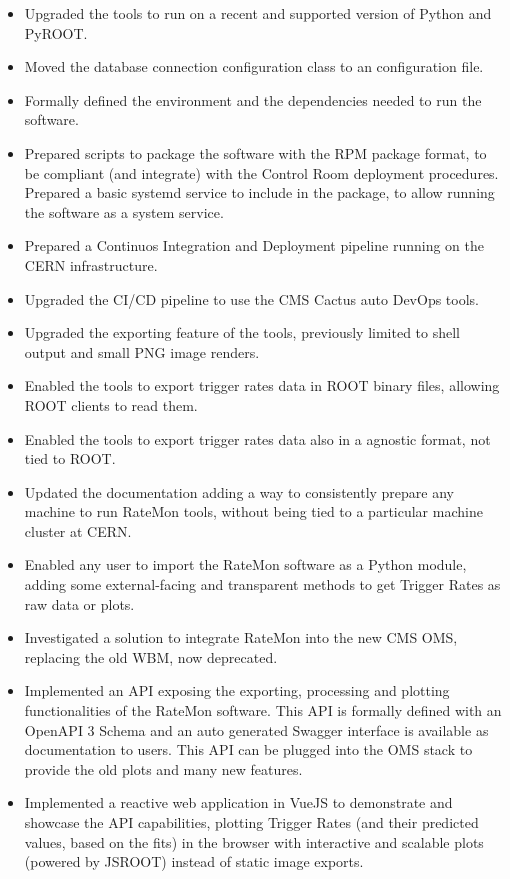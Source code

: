 \documentclass[a4, oneside, 11pt, nobib]{memoir}
\begin{document}
		\begin{itemize}

		\item Upgraded the tools to run on a recent and supported version of Python and PyROOT.
		\item Moved the database connection configuration class to an configuration file.
		\item Formally defined the environment and the dependencies needed to run the software.
		\item Prepared scripts to package the software with the RPM package format, to be compliant (and integrate) with the Control Room deployment procedures. Prepared a basic systemd service to include in the package, to allow running the software as a system service.
		\item Prepared a Continuos Integration and Deployment pipeline running on the CERN infrastructure.
		\item Upgraded the CI/CD pipeline to use the CMS Cactus \cite{DirkxCactus} auto DevOps tools.
		\item Upgraded the exporting feature of the tools, previously limited to shell output and small PNG image renders.
		\item Enabled the tools to export trigger rates data in ROOT binary files, allowing ROOT clients to read them.
		\item Enabled the tools to export trigger rates data also in a agnostic format, not tied to ROOT.
		\item Updated the documentation adding a way to consistently prepare any machine to run RateMon tools, without being tied to a particular machine cluster at CERN.
		\item Enabled any user to import the RateMon software as a Python module, adding some external-facing and transparent methods to get Trigger Rates as raw data or plots.
		\item Investigated a solution to integrate RateMon into the new CMS OMS, replacing the old WBM, now deprecated.
		\item Implemented an API exposing the exporting, processing and plotting functionalities of the RateMon software. This API is formally defined with an OpenAPI 3 Schema and an auto generated Swagger interface is available as documentation to users. This API can be plugged into the OMS stack to provide the old plots and many new features.
		\item Implemented a reactive web application in VueJS to demonstrate and showcase the API capabilities, plotting Trigger Rates (and their predicted values, based on the fits) in the browser with interactive and scalable plots (powered by JSROOT) instead of static image exports.

\end{itemize}
\end{document}

